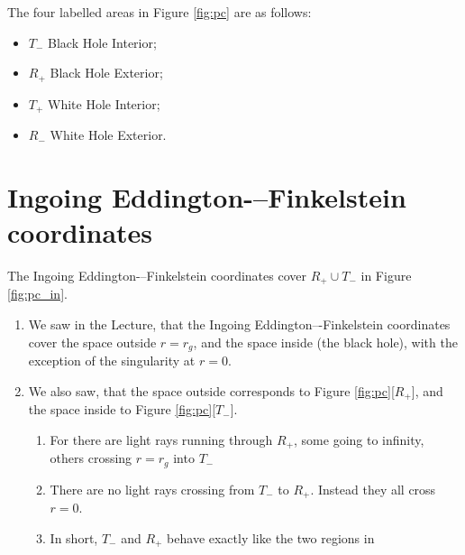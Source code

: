 \documentclass[]{article}
\begin{document}
The four labelled areas in Figure \ref{fig:pc} are as follows:
\begin{itemize}
	\item $T_-$  Black Hole Interior;
	\item $R_+$  Black Hole Exterior;
	\item $T_+$  White Hole Interior;
	\item $R_-$  White Hole Exterior.
\end{itemize}
\section{Ingoing Eddington-–Finkelstein coordinates}
The Ingoing Eddington-–Finkelstein coordinates cover $R_+\cup T_-$ in Figure \ref{fig:pc_in}.
\begin{enumerate}
	\item We saw in the Lecture, \cite[IV,Figure 8]{akhmedev2016} that the Ingoing Eddington–-Finkelstein coordinates cover the space outside $r=r_g$, and the space inside (the black hole), with the exception of the singularity at $r=0$.
	\item We also saw, \cite[V,Figure 11]{akhmedev2016} that the space outside corresponds to Figure \ref{fig:pc}[$R_+$], and the space inside to Figure \ref{fig:pc}[$T_-$].
	\begin{enumerate}
		\item For there are light rays running through $R_+$, some going to infinity, others crossing $r=r_g$ into $T_-$
		\item There are no light rays crossing from $T_-$ to $R_+$. Instead they all cross $r=0$.
		\item In short, $T_-$ and $R_+$ behave exactly like the two regions in \cite[V,Figure 11]{akhmedev2016}
	\end{enumerate}
\begin{figure}[H]
\end{figure}
\end{enumerate}
\end{document}
